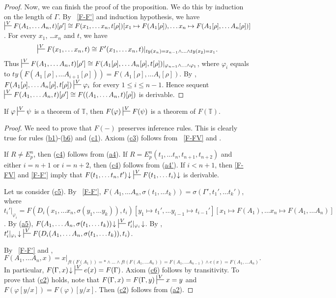 \documentclass[reqno]{amsart}
\newcommand{\axref}[1]{(\hyperref[ax:#1]{#1})}
\theoremstyle{definition}
\theoremstyle{remark}
\numberwithin{figure}{section}
\begin{document}
\begin{proof}
Now, we can finish the proof of the proposition.
We do this by induction on the length of $\Gamma$.
By ~\eqref{F-F'} and induction hypothesis, we have
$\sststile{}{V} F(A_1, \ldots A_n, t)[\rho'] \cong F(x_1, \ldots x_n, t[\rho])[x_1 \mapsto F(A_1[\rho]), \ldots x_n \mapsto F(A_1[\rho], \ldots A_n[\rho])]$.
For every $x_1$, \ldots $x_n$ and $t$, we have
\[ \sststile{}{V} F(x_1, \ldots x_n, t) \cong F'(x_1, \ldots x_n, t)|_{ty(x_n) = x_{n-1} \land \ldots \land ty(x_2) = x_1}. \]
Thus $\sststile{}{V} F(A_1, \ldots A_n, t)[\rho'] \cong F(A_1[\rho], \ldots A_n[\rho], t[\rho])|_{\varphi_{n-1} \land \ldots \land \varphi_1}$,
    where $\varphi_i$ equals to $ty(F(A_1[\rho], \ldots A_{i+1}[\rho])) = F(A_1[\rho], \ldots A_i[\rho])$.
By , $F(A_1[\rho], \ldots A_n[\rho], \allowbreak t[\rho]) \sststile{}{V} \varphi_i$ for every $1 \leq i \leq n-1$.
Hence sequent $\sststile{}{V} F(A_1, \ldots A_n, t)[\rho'] \cong F((A_1, \ldots A_n, t)[\rho])$ is derivable.
\end{proof}

\begin{prop}[F-ax]
If $\varphi \sststile{}{V} \psi$ is a theorem of $\mathbb{T}$, then $F(\varphi) \sststile{}{V} F(\psi)$ is a theorem of $F(\mathbb{T})$.
\end{prop}
\begin{proof}
We need to prove that $F(-)$ preserves inference rules.
This is clearly true for rules \axref{b1}-\axref{b6} and \axref{c1}.
Axiom \axref{c3} follows from ~\eqref{F-FV} and .

If $R \neq E^n_p$, then \axref{c4} follows from \axref{a4}.
If $R = E^n_p(t_1, \ldots t_n, t_{n+1}, t_{n+2})$ and either $i = n+1$ or $i = n+2$, then \axref{c4} follows from \axref{a4'}.
If $i < n+1$, then  \eqref{F-FV} and \eqref{F-F'} imply that $F(t_1, \ldots t_n, t')\!\downarrow\ \sststile{}{V} F(t_1, \ldots t_i)\!\downarrow$ is derivable.

Let us consider \axref{c5}.
By ~\eqref{F-F'}, $F(A_1, \ldots A_n, \sigma(t_1, \ldots t_k)) = \sigma(\Gamma', t_1', \ldots t_k')$, where
    $t_i'|_{\varphi_i} = F(D_i(x_1, \ldots x_n, \sigma(y_1, \ldots y_k)), t_i)[y_1 \mapsto t_1', \ldots y_{i-1} \mapsto t_{i-1}'][x_1 \mapsto F(A_1), \ldots x_n \mapsto F(A_1, \ldots A_n)]$.
By \axref{a5}, $F(A_1, \ldots A_n, \sigma(t_1, \ldots t_k))\!\downarrow\ \sststile{}{V} t_i'|_{\varphi_i}\!\downarrow$.
By , $t_i'|_{\varphi_i}\!\downarrow\ \sststile{}{V} F(D_i(A_1, \ldots A_n, \sigma(t_1, \ldots t_k)), t_i)$.

By ~\eqref{F-F'} and ,
\[ F(A_1, \ldots A_n, x) = x|_{ft(F(A_1)) = * \land \ldots \land ft(F(A_1, \ldots A_n)) = F(A_1, \ldots A_{n-1}) \land e(x) = F(A_1, \ldots A_n)}. \]
In particular, $F(\Gamma,x)\!\downarrow\ \sststile{}{V} e(x) = F(\Gamma)$.
Axiom \axref{c6} follows by transitivity.
To prove that \axref{c2} holds, note that $F(\Gamma,x) = F(\Gamma,y) \sststile{}{V} x = y$ and $F(\varphi[y/x]) = F(\varphi)[y/x]$.
Then \axref{c2} follows from \axref{a2}.
\end{proof}
\end{document}
